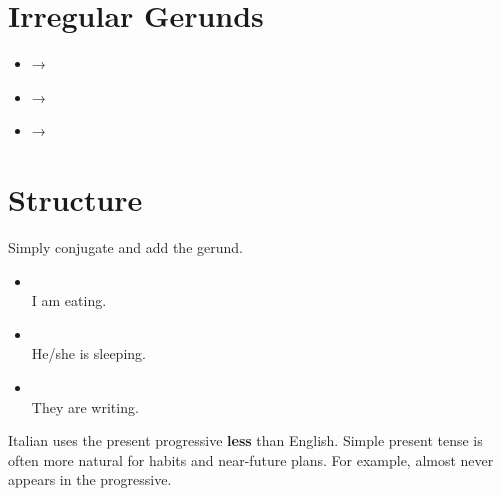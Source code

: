 \section{Irregular Gerunds}
\begin{itemize}[nosep]
    \item {} → 
    \item {} → 
    \item {} → 
\end{itemize}

\section{Structure}
Simply conjugate  and add the gerund.

\begin{itemize}[nosep]
    \item {}    \\
    I am eating.
    \item {}     \\
    He/she is sleeping.
    \item {} \\
    They are writing.
\end{itemize}

Italian uses the present progressive \textbf{less} than English. Simple present tense is
often more natural for habits and near-future plans. For example,  almost never appears in the progressive.

